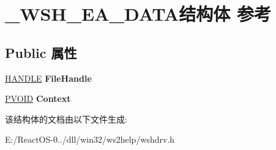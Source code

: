 \hypertarget{struct___w_s_h___e_a___d_a_t_a}{}\section{\+\_\+\+W\+S\+H\+\_\+\+E\+A\+\_\+\+D\+A\+T\+A结构体 参考}
\label{struct___w_s_h___e_a___d_a_t_a}
\subsection*{Public 属性}
\begin{DoxyCompactItemize}
\item 
\mbox{\label{struct___w_s_h___e_a___d_a_t_a_a42cec5b714534b049757d1487b528437}} 
\hyperlink{interfacevoid}{H\+A\+N\+D\+LE} {\bfseries File\+Handle}
\item 
\mbox{\label{struct___w_s_h___e_a___d_a_t_a_ab2ddedc0ac57402203c7769d259af99f}} 
\hyperlink{interfacevoid}{P\+V\+O\+ID} {\bfseries Context}
\end{DoxyCompactItemize}


该结构体的文档由以下文件生成\+:\begin{DoxyCompactItemize}
\item 
E\+:/\+React\+O\+S-\/0../dll/win32/ws2help/wshdrv.\+h\end{DoxyCompactItemize}
